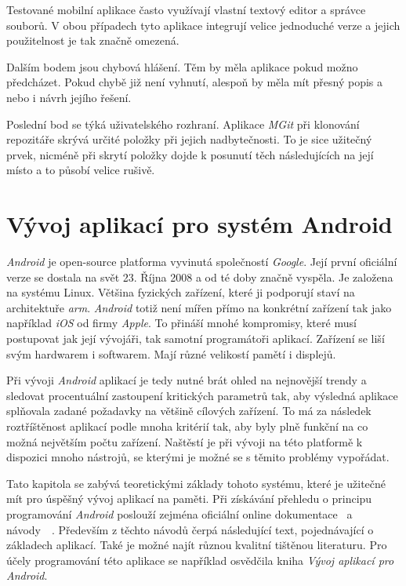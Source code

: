     Testované mobilní aplikace často využívají vlastní textový editor a správce souborů. V obou případech tyto aplikace integrují velice jednoduché verze a jejich použitelnost je tak značně omezená.

    Dalším bodem jsou chybová hlášení. Těm by měla aplikace pokud možno předcházet. Pokud chybě již není vyhnutí, alespoň by měla mít přesný popis a nebo i návrh jejího řešení.

    Poslední bod se týká uživatelského rozhraní. Aplikace \emph{MGit} při klonování repozitáře skrývá určité položky při jejich nadbytečnosti. To je sice užitečný prvek, nicméně při skrytí položky dojde k posunutí těch následujících na její místo a to působí velice rušivě.

\chapter{Vývoj aplikací pro systém Android}
\emph{Android} je open-source platforma vyvinutá společností \emph{Google}. Její první oficiální verze se dostala na svět 23. Října 2008 a od té doby značně vyspěla. Je založena na systému Linux. Většina fyzických zařízení, které ji podporují staví na architektuře \emph{arm}. \emph{Android} totiž není mířen přímo na konkrétní zařízení tak jako například \emph{iOS} od firmy \emph{Apple}. To přináší mnohé kompromisy, které musí postupovat jak její vývojáři, tak samotní programátoři aplikací. Zařízení se liší svým hardwarem i softwarem. Mají různé velikostí pamětí i displejů.

Při vývoji \emph{Android} aplikací je tedy nutné brát ohled na nejnovější trendy a sledovat procentuální zastoupení kritických parametrů tak, aby výsledná aplikace splňovala zadané požadavky na většině cílových zařízení. To má za následek roztříštěnost aplikací podle mnoha kritérií tak, aby byly plně funkční na co možná největším počtu zařízení. Naštěstí je při vývoji na této platformě k dispozici mnoho nástrojů, se kterými je možné se s těmito problémy vypořádat.

Tato kapitola se zabývá teoretickými základy tohoto systému, které je užitečné mít pro úspěšný vývoj aplikací na paměti. Při získávání přehledu o principu programování \emph{Android} poslouží zejména oficiální online dokumentace~ a návody~~. Především z těchto návodů čerpá následující text, pojednávající o základech aplikací. Také je možné najít různou kvalitní tištěnou literaturu. Pro účely programování této aplikace se například osvědčila kniha \emph{Vývoj aplikací pro Android}\cite{android-Lacko}.

